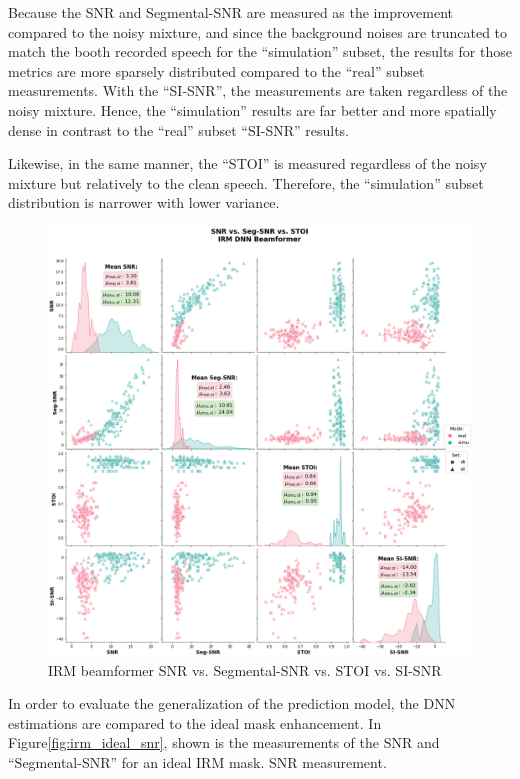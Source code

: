 Because the SNR and Segmental-SNR are measured as the improvement
compared to the noisy mixture, 
and since the background noises are truncated 
to match the booth recorded speech for the ``simulation'' subset, 
the results for those metrics are more sparsely distributed 
compared to the ``real'' subset measurements. 
With the ``SI-SNR'', 
the measurements are taken regardless of the noisy mixture. 
Hence, the ``simulation'' results are far better 
and more spatially dense 
in contrast to the ``real'' subset ``SI-SNR'' results.

Likewise, in the same manner, 
the ``STOI'' is measured regardless of the noisy mixture
but relatively to the clean speech. 
Therefore, the ``simulation'' 
subset distribution is narrower with lower variance.


\begin{figure}[H]
    \centering
    \includegraphics[width=\linewidth]{Features/images/irm_snr_stoi}
    \caption{IRM beamformer SNR vs. Segmental-SNR vs. STOI vs. SI-SNR}\label{fig:irm_snr_stoi}
\end{figure}

In order to evaluate the generalization of the prediction model,
the DNN estimations are compared to the ideal mask enhancement.
In Figure\;\ref{fig:irm_ideal_snr}, shown is the measurements of 
the SNR and ``Segmental-SNR'' for an ideal IRM mask.
SNR measurement.

